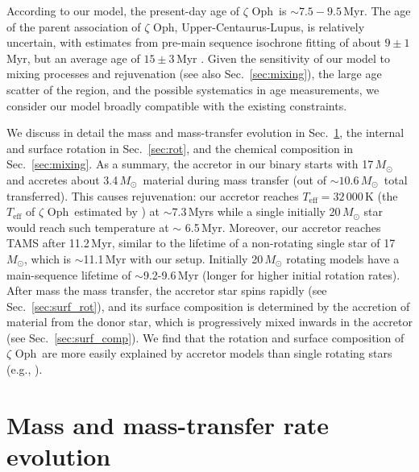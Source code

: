 \documentclass[twocolumn,twocolappendix,trackchanges]{aastex63}
\DeclareRobustCommand{\Secref}[1]{Sec.~\ref{#1}}
\newcommand{\zoph}{$\zeta$ Oph}
\newcommand{\Msun}{\ensuremath{\,M_\odot}}
\begin{document}
According to our model, the
present-day age of \zoph\ is $\sim{}7.5-9.5$\,Myr.  The age of the parent
association of \zoph, Upper-Centaurus-Lupus, is relatively uncertain,
with estimates from pre-main sequence isochrone fitting of about
$9\pm1$\,Myr, but an average age of $15\pm3$\,Myr
\citep[][]{pecaut:16}.  Given the sensitivity of our model to
mixing processes and rejuvenation (see also \Secref{sec:mixing}), the large age
scatter of the region, and the possible systematics in age
measurements, we consider our model broadly compatible with the
existing constraints.

We discuss in detail the mass and mass-transfer evolution in
\Secref{sec:MT}, the internal and surface rotation in
\Secref{sec:rot}, and the chemical composition in
\Secref{sec:mixing}. As a summary, the accretor in our binary starts
with 17$\,M_\odot$ and accretes about 3.4\Msun\ material during mass
transfer (out of $\sim{}10.6$\Msun\ total transferred). This causes
rejuvenation: our accretor reaches $T_\mathrm{eff}=32\,000$\,K (the
$T_\mathrm{eff}$ of \zoph\ estimated by ) at
$\sim{}7.3$\,Myrs while a single initially 20\,$M_\odot$ star would reach
such temperature at $\sim$ 6.5\,Myr. Moreover, our accretor reaches
TAMS after 11.2\,Myr, similar to the lifetime of a non-rotating single
star of 17\,$M_\odot$, which is $\sim$11.1\,Myr with our setup. Initially
20\,$M_\odot$ rotating models have a main-sequence lifetime of
$\sim$9.2-9.6\,Myr (longer for higher initial rotation rates). After
mass the mass transfer, the accretor star spins rapidly (see
\Secref{sec:surf_rot}), and its surface composition is determined by
the accretion of material from the donor star, which is progressively mixed
inwards in the accretor (see \Secref{sec:surf_comp}). We find that the rotation and
surface composition of \zoph\ are more easily explained by accretor
models than single rotating stars (e.g., ).


\section{Mass and mass-transfer rate evolution}
\label{sec:MT}
\end{document}
